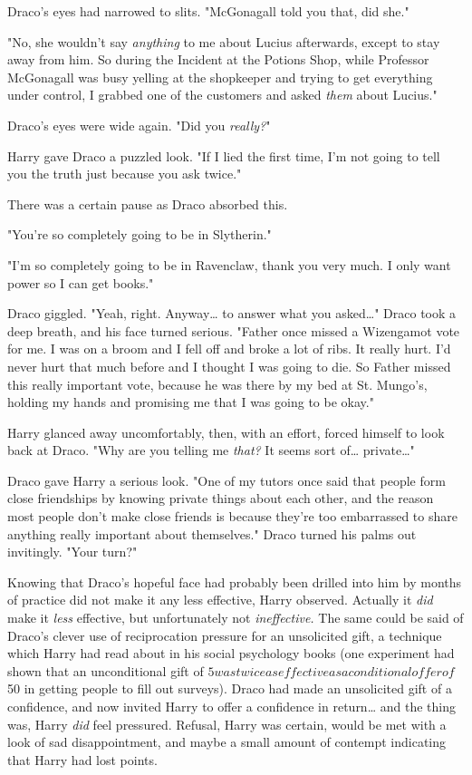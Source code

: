 Draco's eyes had narrowed to slits. "McGonagall told you that, did she."

"No, she wouldn't say \emph{anything} to me about Lucius afterwards, except to 
stay away from him. So during the Incident at the Potions Shop, while Professor 
McGonagall was busy yelling at the shopkeeper and trying to get everything 
under control, I grabbed one of the customers and asked \emph{them} about 
Lucius."

Draco's eyes were wide again. "Did you \emph{really?}"

Harry gave Draco a puzzled look. "If I lied the first time, I'm not going to 
tell you the truth just because you ask twice."

There was a certain pause as Draco absorbed this.

"You're so completely going to be in Slytherin."

"I'm so completely going to be in Ravenclaw, thank you very much. I only want 
power so I can get books."

Draco giggled. "Yeah, right. Anyway{\ldots} to answer what you asked{\ldots}" 
Draco took a deep breath, and his face turned serious. "Father once missed a 
Wizengamot vote for me. I was on a broom and I fell off and broke a lot of 
ribs. It really hurt. I'd never hurt that much before and I thought I was going 
to die. So Father missed this really important vote, because he was there by my 
bed at St. Mungo's, holding my hands and promising me that I was going to be 
okay."

Harry glanced away uncomfortably, then, with an effort, forced himself to look 
back at Draco. "Why are you telling me \emph{that?} It seems sort of{\ldots} 
private{\ldots}"

Draco gave Harry a serious look. "One of my tutors once said that people form 
close friendships by knowing private things about each other, and the reason 
most people don't make close friends is because they're too embarrassed to 
share anything really important about themselves." Draco turned his palms out 
invitingly. "Your turn?"

Knowing that Draco's hopeful face had probably been drilled into him by months 
of practice did not make it any less effective, Harry observed. Actually it 
\emph{did} make it \emph{less} effective, but unfortunately not 
\emph{ineffective.} The same could be said of Draco's clever use of 
reciprocation pressure for an unsolicited gift, a technique which Harry had 
read about in his social psychology books (one experiment had shown that an 
unconditional gift of $5 was twice as effective as a conditional offer of $50 
in getting people to fill out surveys). Draco had made an unsolicited gift of a 
confidence, and now invited Harry to offer a confidence in return{\ldots} and 
the thing was, Harry \emph{did} feel pressured. Refusal, Harry was certain, 
would be met with a look of sad disappointment, and maybe a small amount of 
contempt indicating that Harry had lost points.

